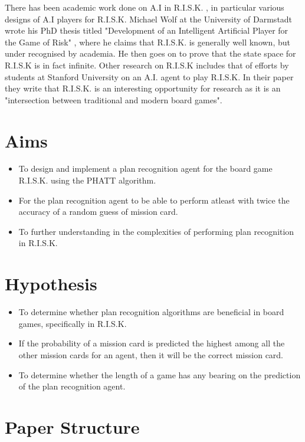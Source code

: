\documentclass[parskip]{cs4rep}
\begin{document}
There has been academic work done on A.I in R.I.S.K. , in particular various designs of A.I players for R.I.S.K. Michael Wolf at the University of Darmstadt wrote his PhD thesis titled "Development of an Intelligent Artificial Player for the Game of Risk" \cite{michaelwolf}, where he claims that R.I.S.K. is generally well known, but under recognised by academia. He then goes on to prove that the state space for R.I.S.K is in fact infinite. Other research on R.I.S.K includes that of efforts by students at Stanford University on an A.I. \cite{jlozanodbratz} agent to play R.I.S.K. In their paper they write that R.I.S.K. is an interesting opportunity for research as it is an "intersection between traditional and modern board games".

\section{Aims}

\begin{itemize}
\item
To design and implement a plan recognition agent for the board game R.I.S.K. using the PHATT algorithm.
\item
For the plan recognition agent to be able to perform atleast with twice the accuracy of a random guess of mission card.
\item
To further understanding in the complexities of performing plan recognition in R.I.S.K.
\end{itemize}

\section{Hypothesis}

\begin{itemize}
\item
To determine whether plan recognition algorithms are beneficial in board games, specifically in R.I.S.K.
\item
If the probability of a mission card is predicted the highest among all the other mission cards for an agent, then it will be the correct mission card.
\item
To determine whether the length of a game has any bearing on the prediction of the plan recognition agent.
\end{itemize}

\section{Paper Structure}
\end{document}
